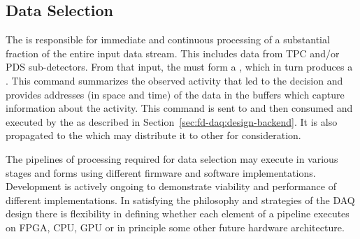 



\subsection{Data Selection}
\label{sec:sp-daq:design-selection-algs}

The  is responsible for immediate and continuous processing of a substantial fraction of the entire input data stream. 
This includes data from TPC and/or PDS sub-detectors.
From that input, the  must form a ,
which in turn produces a .
This command summarizes the observed activity that led to the decision
and provides addresses (in space and time) of the data in the  buffers which capture information about the activity.
This command is sent to and then consumed and executed by the  as described in Section~\ref{sec:fd-daq:design-backend}. 
It is also propagated to the  which may distribute it to other  for consideration.

The pipelines of processing required for data selection may execute in
various stages and forms using different firmware and software
implementations. 
Development is actively ongoing to demonstrate
viability and performance of different implementations. In satisfying
the philosophy and strategies of the DAQ design there is 
flexibility in defining whether each element of a pipeline executes on
FPGA, CPU, GPU or in principle some other future hardware
architecture. 

